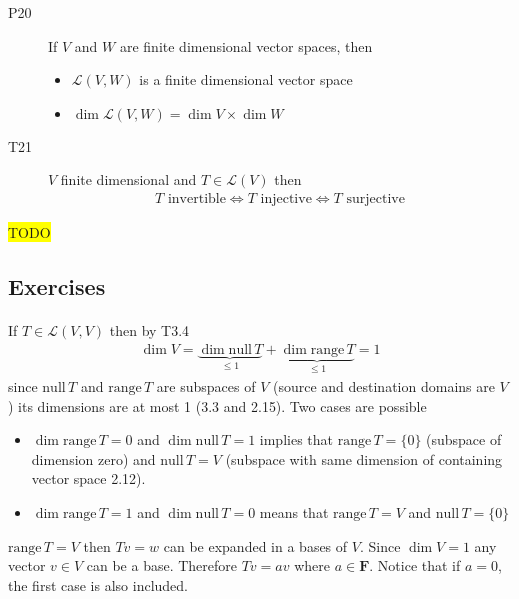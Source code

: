 \documentclass[11pt,notitlepage,oneside]{article}
\newcommand{\hilight}[1]{\colorbox{yellow}{#1}}
\newcommand{\exo}[1]{%
\addtocontents{toc}{\protect\setcounter{tocdepth}{2}}%
\paragraph{#1}}
\newcommand{\nullspace}[1]{\mathrm{null}\,{#1}}
\newcommand{\rangespace}[1]{\mathrm{range}\,{#1}}
\begin{document}
\begin{description}
  \item[P20\label{itm:P3_20}] If $V$ and $W$ are finite dimensional vector spaces, then
  \begin{itemize}
  \item $\mathcal{L}(V,W)$ is a finite dimensional vector space
  \item $\dim{\mathcal{L}(V,W)} = \dim{V} \times \dim{W}$
  \end{itemize}
  
  \item[T21\label{itm:T3_21}] $V$ finite dimensional and $T\in\mathcal{L}(V)$ then
  \begin{align*}
  T \text{ invertible} \iff T \text{ injective} \iff T \text{ surjective} 
  \end{align*}
  
  
  \end{description}
  
  \hilight{TODO}
  
  \subsection*{Exercises}
  \setcounter{paragraph}{0}
  
  \exo{} If $T \in \mathcal{L}(V,V)$ then by T3.4
  \begin{align*}
  \dim{V} = \underbrace{\dim{\nullspace{T}}}_{\leq 1} + \underbrace{\dim{\rangespace{T}}}_{\leq 1} = 1
  \end{align*}
  since $\nullspace{T}$ and $\rangespace{T}$ are subspaces of $V$ (source and destination domains are $V$) its dimensions are at most 1 (3.3 and 2.15). Two cases are possible
  \begin{itemize}
  \item $\dim{\rangespace{T}}=0$ and $\dim{\nullspace{T}}=1$ implies that $\rangespace{T}=\{0\}$ (subspace of dimension zero) and $\nullspace{T}=V$ (subspace with same dimension of containing vector space 2.12).
  \item $\dim{\rangespace{T}}=1$ and $\dim{\nullspace{T}}=0$ means that $\rangespace{T}=V$ and $\nullspace{T}=\{0\}$ 
  \end{itemize}
  
  $\rangespace{T}=V$ then $Tv = w$ can be expanded in a bases of $V$. Since $\dim{V}=1$ any vector $v\in V$ can be a base. Therefore $Tv = a v$ where $a\in \mathbf{F}$. Notice that if $a=0$, the first case is also included.
  
\end{document}
